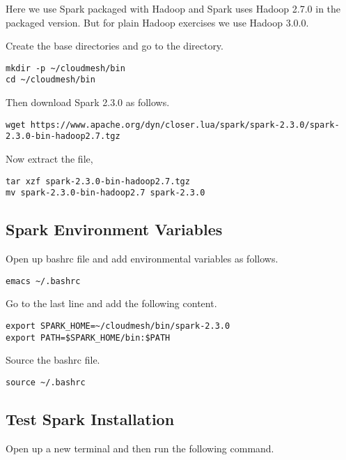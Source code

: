 \begin{NOTE}
  Here we use Spark packaged with Hadoop and Spark uses Hadoop 2.7.0
  in the packaged version. But for plain Hadoop exercises we use
  Hadoop 3.0.0.
\end{NOTE}

Create the base directories and go to the directory.

\begin{lstlisting}
mkdir -p ~/cloudmesh/bin
cd ~/cloudmesh/bin
\end{lstlisting}
  
Then download Spark 2.3.0 as follows. 

\begin{lstlisting}
wget https://www.apache.org/dyn/closer.lua/spark/spark-2.3.0/spark-2.3.0-bin-hadoop2.7.tgz
\end{lstlisting}

Now extract the file,

\begin{lstlisting}
tar xzf spark-2.3.0-bin-hadoop2.7.tgz
mv spark-2.3.0-bin-hadoop2.7 spark-2.3.0
\end{lstlisting}

\subsection{Spark Environment Variables}

Open up bashrc file and add environmental variables as follows.

\begin{lstlisting}
emacs ~/.bashrc  
\end{lstlisting}

Go to the last line and add the following content.

\begin{lstlisting}
export SPARK_HOME=~/cloudmesh/bin/spark-2.3.0
export PATH=$SPARK_HOME/bin:$PATH
\end{lstlisting}  

Source the bashrc file.

\begin{lstlisting}
source ~/.bashrc
\end{lstlisting}

\subsection{Test Spark Installation}

Open up a new terminal and then run the following command.

